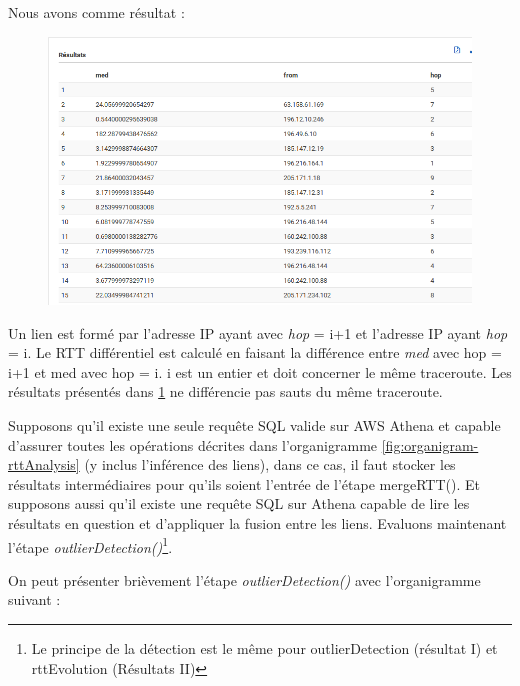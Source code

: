 Nous avons comme résultat :

\begin{figure}[H]
\centering
\includegraphics[width=1\linewidth]{illustrations/data_request}
\caption{}
\label{fig:data_request}
\end{figure}

Un lien est formé par l'adresse IP ayant avec \textit{hop} = i+1 et l'adresse IP ayant \textit{hop} = i. Le RTT différentiel est calculé en faisant la différence entre \textit{med} avec hop = i+1 et med avec hop = i. i est un entier et doit concerner le même traceroute. Les résultats présentés dans \ref{fig:data_request} ne différencie pas sauts du même traceroute.


Supposons qu'il existe une seule requête SQL valide sur AWS Athena et capable d'assurer toutes les opérations décrites dans l'organigramme \ref{fig:organigram-rttAnalysis} (y inclus l'inférence des liens), dans ce cas, il faut stocker les résultats intermédiaires pour qu'ils soient l'entrée de l'étape mergeRTT(). Et supposons aussi qu'il existe une requête SQL sur Athena capable de lire les résultats en question et d'appliquer la fusion entre les liens. Evaluons maintenant l'étape \textit{outlierDetection()}\footnote{Le principe de la détection est le même pour outlierDetection (résultat I) et rttEvolution (Résultats II)}. 


 On peut présenter brièvement l'étape \textit{outlierDetection()} avec l'organigramme suivant :
 
